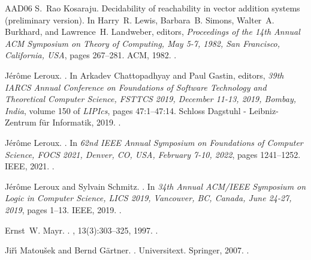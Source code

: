 \documentclass[11pt,a4paper]{amsart}
\theoremstyle{plain}
\theoremstyle{definition}
\theoremstyle{defC}
\theoremstyle{thmC}
\begin{document}
\begin{thebibliography}{AAD{\etalchar{+}}06}
S.~Rao Kosaraju.
\newblock Decidability of reachability in vector addition systems (preliminary
  version).
\newblock In Harry~R. Lewis, Barbara~B. Simons, Walter~A. Burkhard, and
  Lawrence~H. Landweber, editors, {\em Proceedings of the 14th Annual {ACM}
  Symposium on Theory of Computing, May 5-7, 1982, San Francisco, California,
  {USA}}, pages 267--281. {ACM}, 1982.
\newblock \href {https://doi.org/10.1145/800070.802201}
  {}.

J{\'{e}}r{\^{o}}me Leroux.
.
\newblock In Arkadev Chattopadhyay and Paul Gastin, editors, {\em 39th {IARCS}
  Annual Conference on Foundations of Software Technology and Theoretical
  Computer Science, {FSTTCS} 2019, December 11-13, 2019, Bombay, India}, volume
  150 of {\em LIPIcs}, pages 47:1--47:14. Schloss Dagstuhl - Leibniz-Zentrum
  f{\"{u}}r Informatik, 2019.
\newblock \href {https://doi.org/10.4230/LIPIcs.FSTTCS.2019.47}
  {}.

J{\'{e}}r{\^{o}}me Leroux.
.
\newblock In {\em 62nd {IEEE} Annual Symposium on Foundations of Computer
  Science, {FOCS} 2021, Denver, CO, USA, February 7-10, 2022}, pages
  1241--1252. {IEEE}, 2021.
\newblock \href {https://doi.org/10.1109/FOCS52979.2021.00121}
  {}.

J{\'{e}}r{\^{o}}me Leroux and Sylvain Schmitz.
.
\newblock In {\em 34th Annual {ACM/IEEE} Symposium on Logic in Computer
  Science, {LICS} 2019, Vancouver, BC, Canada, June 24-27, 2019}, pages 1--13.
  {IEEE}, 2019.
\newblock \href {https://doi.org/10.1109/LICS.2019.8785796}
  {}.

Ernst~W. Mayr.
.
, 13(3):303--325, 1997.
\newblock \href {https://doi.org/10.1006/jcom.1997.0447}
  {}.

Ji\v{r}{\'{\i}} Matou\v{s}ek and Bernd G{\"{a}}rtner.
.
\newblock Universitext. Springer, 2007.
\newblock \href {https://doi.org/10.1007/978-3-540-30717-4}
  {}.


\end{thebibliography}
\end{document}
